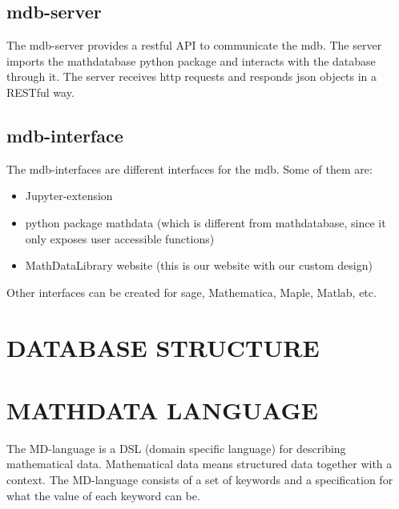 \documentclass[12pt,twoside]{article}
\begin{document}
	\subsection*{mdb-server}
	\par The mdb-server provides a restful API to communicate the mdb. 
	The server imports the mathdatabase python package and interacts with the database through it.
	The server receives http requests and responds json objects in a RESTful way.
	
	\subsection*{mdb-interface}
	\par The mdb-interfaces are different interfaces for the mdb. 
	Some of them are:
	\begin{itemize}
		\item Jupyter-extension
		\item python package mathdata (which is different from mathdatabase, since it only exposes user accessible functions)
		\item MathDataLibrary website (this is our website with our custom design)
	\end{itemize}
	
	\par Other interfaces can be created for sage, Mathematica, Maple, Matlab, etc.
	
	\section{DATABASE STRUCTURE}
	
		
			
	\section{MATHDATA LANGUAGE}
		\par The MD-language is a DSL (domain specific language) for describing mathematical data.
		Mathematical data means structured data together with a context.
		The MD-language consists of a set of keywords and a specification for what the value of each keyword can be.
		
\end{document}
